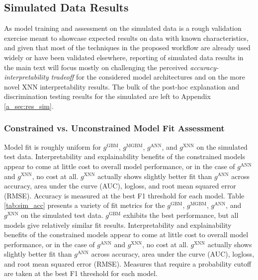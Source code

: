 \documentclass[information,article,submit,moreauthors,pdftex]{definitions/mdpi}
\begin{document}
\subsection{Simulated Data Results}

As model training and assessment on the simulated data is a rough validation exercise meant to showcase expected results on data with known characteristics, and given that most of the techniques in the proposed workflow are already used widely or have been validated elsewhere, reporting of simulated data results in the main text will focus mostly on challenging the perceived \textit{accuracy-interpretability tradeoff} for the considered model architectures and on the more novel XNN interpretability results. The bulk of the post-hoc explanation and discrimination testing results for the simulated are left to Appendix \ref{a_sec:res_sim}. 

\subsubsection{Constrained vs. Unconstrained Model Fit Assessment}\label{ssec:c_v_uc_sim}

Model fit is roughly uniform for $g^\text{GBM}$, $g^\text{MGBM}$, $g^\text{ANN}$, and $g^\text{XNN}$ on the simulated test data. Interpretability and explainability benefits of the constrained models appear to come at little cost to overall model performance, or in the case of $g^\text{ANN}$ and $g^\text{XNN}$, no cost at all. $g^\text{XNN}$ actually shows slightly better fit than $g^\text{ANN}$ across accuracy, area under the curve (AUC), logloss, and root mean squared error (RMSE). Accuracy is measured at the best F1 threshold for each model. Table \ref{tab:sim_acc} presents a variety of fit metrics for the $g^\text{GBM}$, $g^\text{MGBM}$, $g^\text{ANN}$, and $g^\text{XNN}$ on the simulated test data. $g^\text{GBM}$ exhibits the best performance, but all models give relatively similar fit results. Interpretability and explainability benefits of the constrained models appear to come at little cost to overall model performance, or in the case of $g^\text{ANN}$ and $g^\text{XNN}$, no cost at all. $g^\text{XNN}$ actually shows slightly better fit than $g^\text{ANN}$ across accuracy, area under the curve (AUC), logloss, and root mean squared error (RMSE). Measures that require a probability cutoff are taken at the best F1 threshold for each model.
\end{document}
